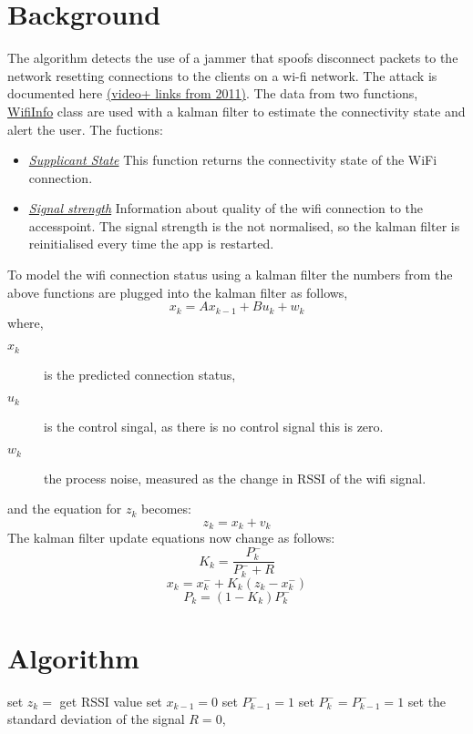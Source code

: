 \documentclass[a4paper,10pt]{article}
\title{}
\author{}
\begin{document}
\section{Background}
The algorithm detects the use of a jammer that spoofs disconnect packets to the network resetting connections to the clients on a wi-fi network. The attack is documented here \href{http://hackaday.com/2011/10/04/wifi-jamming-via-deauthentication-packets/}{(video+ links from 2011)}. The data from two functions, \href{http://developer.android.com/reference/android/net/wifi/WifiInfo.html}{WifiInfo} class are used with a kalman filter to estimate the connectivity state and  alert the user.
The fuctions:
\begin{itemize}
 \item \emph{\href{http://developer.android.com/reference/android/net/wifi/WifiInfo.html\#getSupplicantState()}{Supplicant State}} This function returns the connectivity state of the WiFi connection.
 \item \emph{\href{http://developer.android.com/reference/android/net/wifi/WifiInfo.html\#getRssi()}{Signal strength}} Information about quality of the wifi connection to the accesspoint. The signal strength is the not normalised, so the kalman filter is reinitialised every time the app is restarted.
\end{itemize}

To model the wifi connection status using a kalman filter the numbers from the above functions are plugged into the kalman filter as follows,
\[ x_k = Ax_{k-1} + Bu_k + w_{k} \]
where,
\begin{description}
 \item [$x_k$] is the predicted connection status,
 \item [$u_k$] is the control singal, as there is no control signal this is zero.
 \item [$w_{k}$] the process noise, measured as the change in RSSI of the wifi signal.
\end{description}
and the equation for $z_k$ becomes:
\[  z_k = x_{k} + v_{k} \]
The kalman filter update equations now change as follows:
\[ K_k= \frac{P^-_k}{P^-_k + R} \]
\[ x_k = x^-_k + K_k (z_k - x^-_k) \]
\[ P_k = (1 - K_k)P^-_k\]


\section{Algorithm}
\begin{algorithm}
 \SetAlgoLined
 set $z_k =$  get RSSI value\;
 set $x_{k-1}  = 0 $\;
 set $P^-_{k-1} =1 $\;
 set $P^-_k = P^-_{k-1} =1 $\;
 set the standard deviation of the signal $R = 0$,  \;
\end{algorithm}
\end{document}
